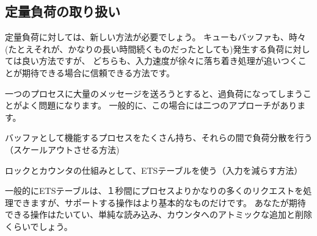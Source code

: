 \subsection{定量負荷の取り扱い}

定量負荷に対しては、新しい方法が必要でしょう。
キューもバッファも、時々(たとえそれが、かなりの長い時間続くものだったとしても)発生する負荷に対しては良い方法ですが、
どちらも、入力速度が徐々に落ち着き処理が追いつくことが期待できる場合に信頼できる方法です。

一つのプロセスに大量のメッセージを送ろうとすると、過負荷になってしまうことがよく問題になります。
一般的に、この場合には二つのアプローチがあります。

\begin{itemize*}
  \item バッファとして機能するプロセスをたくさん持ち、それらの間で負荷分散を行う（スケールアウトさせる方法)
  \item ロックとカウンタの仕組みとして、ETSテーブルを使う（入力を減らす方法）
\end{itemize*}

一般的にETSテーブルは、１秒間にプロセスよりかなりの多くのリクエストを処理できますが、サポートする操作はより基本的なものだけです。
あなたが期待できる操作はたいてい、単純な読み込み、カウンタへのアトミックな追加と削除くらいでしょう。

